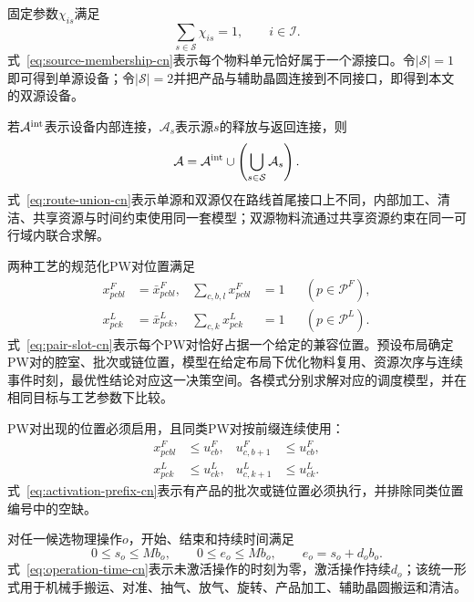 \documentclass[journal]{IEEEtran}
\begin{document}
固定参数$\chi_{is}$满足
\begin{equation}
\sum_{s\in\mathcal S}\chi_{is}=1,
\qquad i\in\mathcal I.
\label{eq:source-membership-cn}
\end{equation}
式~\eqref{eq:source-membership-cn}表示每个物料单元恰好属于一个源接口。令$|\mathcal S|=1$即可得到单源设备；令$|\mathcal S|=2$并把产品与辅助晶圆连接到不同接口，即得到本文的双源设备。

若$\mathcal A^{\rm int}$表示设备内部连接，$\mathcal A_s$表示源$s$的释放与返回连接，则
\begin{equation}
\mathcal A=\mathcal A^{\rm int}\cup
\left(\bigcup_{s\in\mathcal S}\mathcal A_s\right).
\label{eq:route-union-cn}
\end{equation}
式~\eqref{eq:route-union-cn}表示单源和双源仅在路线首尾接口上不同，内部加工、清洁、共享资源与时间约束使用同一套模型；双源物料流通过共享资源约束在同一可行域内联合求解。

两种工艺的规范化PW对位置满足
\begin{equation}
\begin{aligned}
x^F_{pcbl}&=\bar x^F_{pcbl}, &
\sum_{c,b,l}x^F_{pcbl}&=1 &&(p\in\mathcal P^F),\\
x^L_{pck}&=\bar x^L_{pck}, &
\sum_{c,k}x^L_{pck}&=1 &&(p\in\mathcal P^L).
\end{aligned}
\label{eq:pair-slot-cn}
\end{equation}
式~\eqref{eq:pair-slot-cn}表示每个PW对恰好占据一个给定的兼容位置。预设布局确定PW对的腔室、批次或链位置，模型在给定布局下优化物料复用、资源次序与连续事件时刻，最优性结论对应这一决策空间。各模式分别求解对应的调度模型，并在相同目标与工艺参数下比较。

PW对出现的位置必须启用，且同类PW对按前缀连续使用：
\begin{equation}
\begin{aligned}
x^F_{pcbl}&\le u^F_{cb}, &u^F_{c,b+1}&\le u^F_{cb},\\
x^L_{pck}&\le u^L_{ck}, &u^L_{c,k+1}&\le u^L_{ck}.
\end{aligned}
\label{eq:activation-prefix-cn}
\end{equation}
式~\eqref{eq:activation-prefix-cn}表示有产品的批次或链位置必须执行，并排除同类位置编号中的空缺。

对任一候选物理操作$o$，开始、结束和持续时间满足
\begin{equation}
0\le s_o\le Mb_o,\qquad
0\le e_o\le Mb_o,\qquad
e_o=s_o+d_ob_o.
\label{eq:operation-time-cn}
\end{equation}
式~\eqref{eq:operation-time-cn}表示未激活操作的时刻为零，激活操作持续$d_o$；该统一形式用于机械手搬运、对准、抽气、放气、旋转、产品加工、辅助晶圆搬运和清洁。
\end{document}
